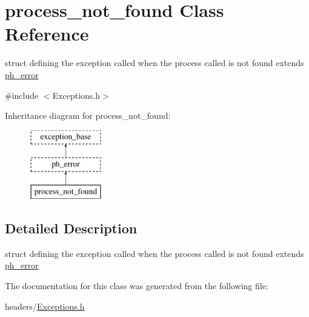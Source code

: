 \hypertarget{structprocess__not__found}{\section{process\-\_\-not\-\_\-found \-Class \-Reference}
\label{structprocess__not__found}
}


struct defining the exception called when the process called is not found extends \hyperlink{structph__error}{ph\-\_\-error}  




{\ttfamily \#include $<$\-Exceptions.\-h$>$}

\-Inheritance diagram for process\-\_\-not\-\_\-found\-:\begin{figure}[H]
\begin{center}
\leavevmode
\includegraphics[height=3.000000cm]{structprocess__not__found}
\end{center}
\end{figure}


\subsection{\-Detailed \-Description}
struct defining the exception called when the process called is not found extends \hyperlink{structph__error}{ph\-\_\-error} 

\-The documentation for this class was generated from the following file\-:\begin{DoxyCompactItemize}
\item 
headers/\hyperlink{_exceptions_8h}{\-Exceptions.\-h}\end{DoxyCompactItemize}
